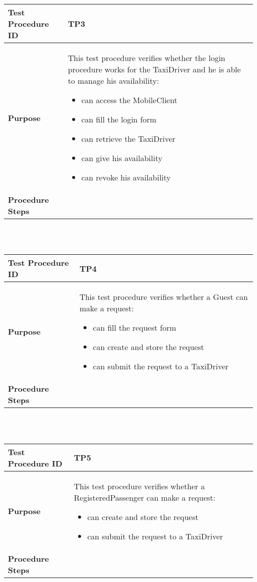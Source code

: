 			\\ \\
			\begin{tabular}{p{4cm} | p{8cm}} \hline
				\textbf{Test Procedure ID} & TP3 \\ \hline
				\textbf{Purpose} & This test procedure verifies whether the login procedure works
				for the TaxiDriver and he is able to manage his availability:
				\begin{itemize}
					\item can access the MobileClient
					\item can fill the login form
					\item can retrieve the TaxiDriver
					\item can give his availability
					\item can revoke his availability
				\end{itemize}
				\\ \hline
				\textbf{Procedure Steps} &  \\ \hline
			\end{tabular}
			\\ \\
			\begin{tabular}{p{4cm} | p{8cm}} \hline
				\textbf{Test Procedure ID} & TP4 \\ \hline
				\textbf{Purpose} & This test procedure verifies whether a Guest can make a request:
				\begin{itemize}
					\item can fill the request form
					\item can create and store the request
					\item can submit the request to a TaxiDriver
				\end{itemize}
				\\ \hline
				\textbf{Procedure Steps} &  \\ \hline
			\end{tabular}
			\\ \\
			\begin{tabular}{p{4cm} | p{8cm}} \hline
				\textbf{Test Procedure ID} & TP5 \\ \hline
				\textbf{Purpose} & This test procedure verifies whether a RegisteredPassenger can make a request:
				\begin{itemize}
					\item can create and store the request
					\item can submit the request to a TaxiDriver
				\end{itemize}
				\\ \hline
				\textbf{Procedure Steps} &  \\ \hline
			\end{tabular}
